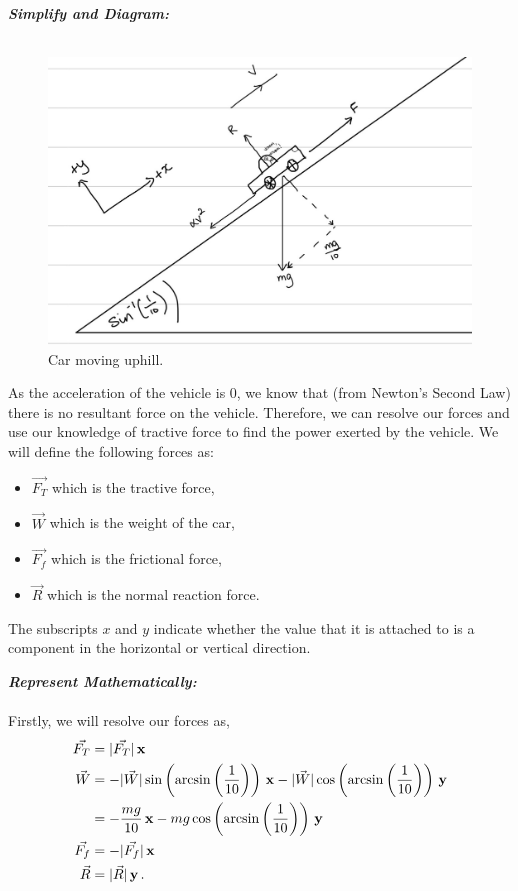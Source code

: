 \begin{subquestions}
	
	
\textbf{\textit{Simplify and Diagram:}} \\ \\	
\begin{figure}[H]
	\begin{center}
		\includegraphics[scale=0.25]{../2009/figures/2009q5-1}
		\caption{\label{2009:q5:Diagram1} Car moving uphill.}
	\end{center}
\end{figure}

As the acceleration of the vehicle is 0, we know that (from Newton's Second Law) there is no resultant force on the vehicle. Therefore, we can resolve our forces and use our knowledge of tractive force to find the power exerted by the vehicle. We will define the following forces as:
\begin{itemize}
	\item $\vec{F_T}$ which is the tractive force,
	\item $\vec{W}$ which is the weight of the car,
	\item $\vec{F_f}$ which is the frictional force,
	\item $\vec{R}$ which is the normal reaction force.
\end{itemize}
The subscripts $x$ and $y$ indicate whether the value that it is attached to is a component in the horizontal or vertical direction.


\textbf{\textit{Represent Mathematically:}} \\ \\
Firstly, we will resolve our forces as,
\begin{align}
	\vec{F_T} & = |\vec{F_T}|\,\mathbf{x} \\
	\vec{W} & = -|\vec{W}|\sin\left(\arcsin\left(\frac{1}{10}\right)\right)\,\mathbf{x} -|\vec{W}|\cos\left(\arcsin\left(\frac{1}{10}\right)\right)\,\mathbf{y} \nonumber \\
	        & = -\frac{mg}{10}\,\mathbf{x} - mg\cos\left(\arcsin\left(\frac{1}{10}\right)\right)\,\mathbf{y} \\
	\vec{F_f} & = -|\vec{F_f}|\,\mathbf{x} \\
	\vec{R} & = |\vec{R}|\,\mathbf{y} \,.
\end{align}


\end{subquestions}
